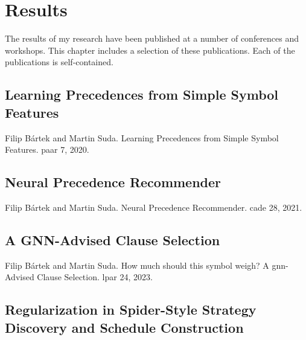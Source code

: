 \newcommand*{\IncludePaper}[2][]{}

\chapter{Results}


The results of my research have been published at a number of conferences and workshops.
This chapter includes a selection of these publications.
Each of the publications is self-contained.


\section{Learning Precedences from Simple Symbol Features}
\label{sec:results:simple}

Filip Bártek and Martin Suda.
Learning Precedences from Simple Symbol Features.
\Acrlong{paar} 7, 2020.
\cite{DBLP:conf/cade/Bartek020}

\IncludePaper{publications/simple.pdf}

\section{Neural Precedence Recommender}
\label{sec:results:npr}

Filip Bártek and Martin Suda.
Neural Precedence Recommender.
\Acrlong{cade} 28, 2021.
\cite{DBLP:conf/cade/Bartek021}

\IncludePaper{publications/Neural Precedence Recommender.pdf}

\section{A GNN-Advised Clause Selection}
\label{sec:results:selection}

Filip Bártek and Martin Suda.
How much should this symbol weigh? A \acrshort{gnn}-Advised Clause Selection.
\Acrlong{lpar} 24, 2023.
\cite{DBLP:conf/lpar/Bartek023}

\IncludePaper{publications/weights.pdf}

\section{Regularization in Spider-Style Strategy Discovery and Schedule Construction}
\label{sec:results:regularization}

